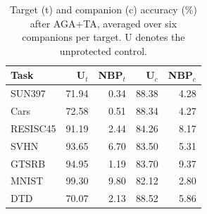 \begin{table}[!htbp]
\centering
\small
\setlength{\tabcolsep}{4pt}
\caption{Target (t) and companion (c) accuracy (\%) after AGA+TA, averaged over six companions per target. U denotes the unprotected control.}
\label{tab:partners}
\begin{tabular}{lrrrr}
\toprule
Task & U$_t$ & NBP$_t$ & U$_c$ & NBP$_c$ \\
\midrule
SUN397 & 71.94 & 0.34 & 88.38 & 4.28 \\
Cars & 72.58 & 0.51 & 88.34 & 4.27 \\
RESISC45 & 91.19 & 2.44 & 84.26 & 8.17 \\
SVHN & 93.65 & 6.70 & 83.50 & 5.31 \\
GTSRB & 94.95 & 1.19 & 83.70 & 9.37 \\
MNIST & 99.30 & 9.80 & 82.12 & 2.80 \\
DTD & 70.07 & 2.13 & 88.52 & 5.86 \\
\bottomrule
\end{tabular}
\end{table}
